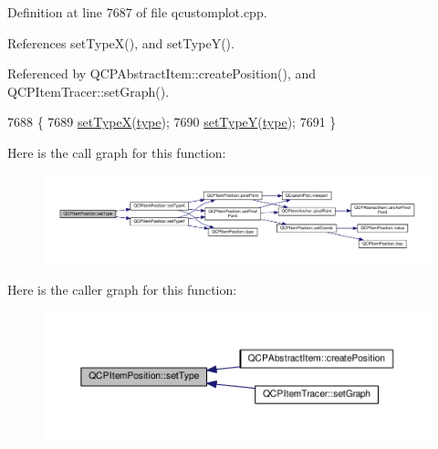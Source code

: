 Definition at line 7687 of file qcustomplot.\+cpp.



References set\+Type\+X(), and set\+Type\+Y().



Referenced by Q\+C\+P\+Abstract\+Item\+::create\+Position(), and Q\+C\+P\+Item\+Tracer\+::set\+Graph().


\begin{DoxyCode}
7688 \{
7689   \hyperlink{class_q_c_p_item_position_a2113b2351d6d00457fb3559a4e20c3ea}{setTypeX}(\hyperlink{class_q_c_p_item_position_aecb709d72c9aa334a7f62e2c9e0b5d60}{type});
7690   \hyperlink{class_q_c_p_item_position_ac2a454aa5a54c1615c50686601ec4510}{setTypeY}(\hyperlink{class_q_c_p_item_position_aecb709d72c9aa334a7f62e2c9e0b5d60}{type});
7691 \}
\end{DoxyCode}


Here is the call graph for this function\+:\nopagebreak
\begin{figure}[H]
\begin{center}
\leavevmode
\includegraphics[width=350pt]{class_q_c_p_item_position_aa476abf71ed8fa4c537457ebb1a754ad_cgraph}
\end{center}
\end{figure}




Here is the caller graph for this function\+:\nopagebreak
\begin{figure}[H]
\begin{center}
\leavevmode
\includegraphics[width=350pt]{class_q_c_p_item_position_aa476abf71ed8fa4c537457ebb1a754ad_icgraph}
\end{center}
\end{figure}


\hypertarget{class_q_c_p_item_position_a2113b2351d6d00457fb3559a4e20c3ea}{}

